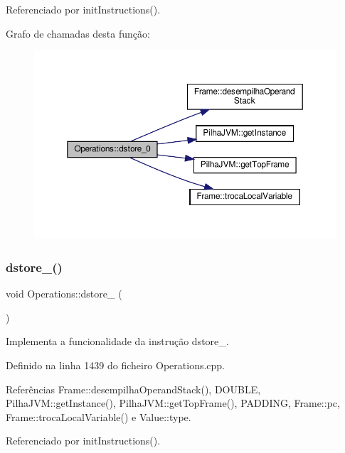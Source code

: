 Referenciado por init\+Instructions().

Grafo de chamadas desta função\+:
\nopagebreak
\begin{figure}[H]
\begin{center}
\leavevmode
\includegraphics[width=350pt]{classOperations_a54dd25692395f6671a3a8e21c73eef6d_cgraph}
\end{center}
\end{figure}
\mbox{\label{classOperations_a5f12c99fca34f123522a6c1461782e5f}} 
\subsubsection{\texorpdfstring{dstore\+\_()}{dstore\_1()}}
{\footnotesize\ttfamily void Operations\+::dstore\+\_ (\begin{DoxyParamCaption}{ }\end{DoxyParamCaption})\hspace{0.3cm}{\ttfamily [private]}}



Implementa a funcionalidade da instrução dstore\+\_. 



Definido na linha 1439 do ficheiro Operations.\+cpp.



Referências Frame\+::desempilha\+Operand\+Stack(), D\+O\+U\+B\+LE, Pilha\+J\+V\+M\+::get\+Instance(), Pilha\+J\+V\+M\+::get\+Top\+Frame(), P\+A\+D\+D\+I\+NG, Frame\+::pc, Frame\+::troca\+Local\+Variable() e Value\+::type.



Referenciado por init\+Instructions().

